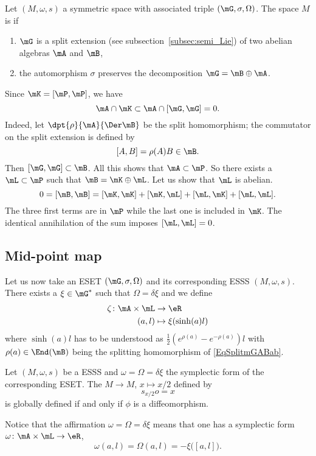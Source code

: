 Let $(M,\omega,s)$ a symmetric space with associated triple $(\mG,\sigma,\Omega)$. The space $M$ is  if

\begin{enumerate}
\item $\mG$ is a split extension  (see subsection~\ref{subsec:semi_Lie}) of two abelian algebras $\mA$ and $\mB$,
\item the automorphism $\sigma$ preserves the decomposition $\mG=\mB\oplus\mA$.
\end{enumerate}
Since $\mK=[\mP,\mP]$, we have
\[
  \mA\cap\mK\subset\mA\cap[\mG,\mG]=0.
\]
Indeed, let $\dpt{\rho}{\mA}{\Der\mB}$ be the split homomorphism; the commutator on the split extension is defined by
\[
  [A,B]=\rho(A)B\in\mB.
\]
Then $[\mG,\mG]\subset\mB$. All this shows that $\mA\subset\mP$. So there exists a $\mL\subset\mP$ such that $\mB=\mK\oplus\mL$. Let us show that $\mL$ is abelian.
\[
  0=[\mB,\mB]=[\mK,\mK]+[\mK,\mL]+[\mL,\mK]+[\mL,\mL].
\]
The three first terms are in $\mP$ while the last one is included in $\mK$. The identical annihilation of the sum imposes $[\mL,\mL]=0$.

\subsection{Mid-point map}

Let us now take an ESET $(\mG,\sigma,\Omega)$ and its corresponding ESSS $(M,\omega,s)$. There exists a $\xi\in\mG^*$ such that $\Omega=\delta\xi$ and we define
\begin{equation}
\begin{aligned}
 \zeta\colon \mA\times\mL&\to \eR \\
(a,l)&\mapsto \xi(\sinh(a)l)
\end{aligned}
\end{equation}
where $\sinh(a)l$ has to be understood as $\frac{ 1 }{2}( e^{\rho(a)}- e^{-\rho(a)})l$ with $\rho(a)\in\End(\mB)$ being the splitting homomorphism of \eqref{EqSplitmGABab}.
\begin{proposition}
Let $(M,\omega,s)$ be a ESSS and $\omega=\Omega=\delta\xi$ the symplectic form of the corresponding ESET. The  $M\to M$, $x\mapsto x/2$ defined by
\[
  s_{x/2}o=x
\]
is globally defined if and only if $\phi$ is a diffeomorphism.
\end{proposition}
Notice that the affirmation $\omega=\Omega=\delta\xi$ means that one has a symplectic form $\omega\colon \mA\times\mL\to \eR$,
\[
  \omega(a,l)=\Omega(a,l)=-\xi\big( [a,l] \big).
\]

